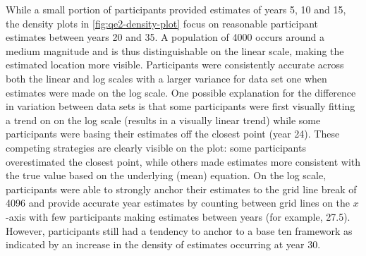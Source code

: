 \documentclass[print]{nuthesis}
\begin{document}
While a small portion of participants provided estimates of years 5, 10 and 15, the density plots in \cref{fig:qe2-density-plot} focus on reasonable participant estimates between years 20 and 35.
A population of 4000 occurs around a medium magnitude and is thus distinguishable on the linear scale, making the estimated location more visible.
Participants were consistently accurate across both the linear and log scales with a larger variance for data set one when estimates were made on the log scale.
One possible explanation for the difference in variation between data sets is that some participants were first visually fitting a trend on on the log scale (results in a visually linear trend) while some participants were basing their estimates off the closest point (year 24).
These competing strategies are clearly visible on the plot: some participants overestimated the closest point, while others made estimates more consistent with the true value based on the underlying (mean) equation.
On the log scale, participants were able to strongly anchor their estimates to the grid line break of 4096 and provide accurate year estimates by counting between grid lines on the \(x\)-axis with few participants making estimates between years (for example, 27.5).
However, participants still had a tendency to anchor to a base ten framework as indicated by an increase in the density of estimates occurring at year 30.
\end{document}
